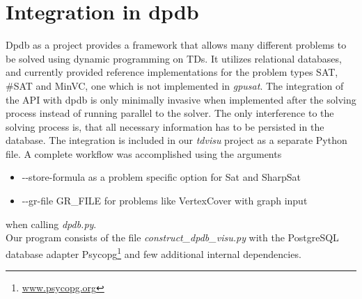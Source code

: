 \documentclass[a4paper, 12pt, bibliography=totoc]{scrartcl}
\begin{document}
\section{Integration in dpdb}\label{sec:dpdb}
{Dpdb} as a project provides a framework that allows many different problems to be solved using dynamic programming on TDs. It utilizes relational databases, and currently provided reference implementations for the problem types SAT, \#SAT and MinVC, one which is not implemented in \textit{gpusat}.
The integration of the API with dpdb is only minimally invasive when implemented after the solving process instead of running parallel to the solver. 
The only interference to the solving process is, that all necessary information has to be persisted in the database.
The integration is included in our \textit{tdvisu} project as a separate Python file.
A complete workflow was accomplished using the arguments
\begin{itemize}
	\item -{}-store-formula as a problem specific option for Sat and SharpSat
	\item -{}-gr-file GR\_FILE for problems like VertexCover with graph input 
\end{itemize}
when calling \textit{dpdb.py}.\\
Our program consists of the file \textit{construct\_dpdb\_visu.py} with the PostgreSQL database adapter Psycopg\footnote{\url{www.psycopg.org}} and few additional internal dependencies.
\end{document}
